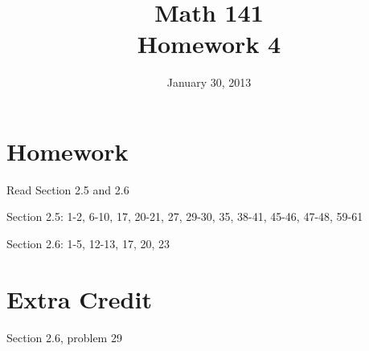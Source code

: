 \documentclass{exam}
\date{January 30, 2013}
\title{Math 141 \\ Homework 4}
\begin{document}

\maketitle

\section{Homework}

\begin{itemize*}
  \item Read Section 2.5 and 2.6
  \item Section 2.5: 1-2, 6-10, 17, 20-21, 27, 29-30, 35, 38-41, 45-46, 47-48, 59-61
  \item Section 2.6: 1-5, 12-13, 17, 20, 23
\end{itemize*}

\section{Extra Credit}
Section 2.6, problem 29
\end{document}
